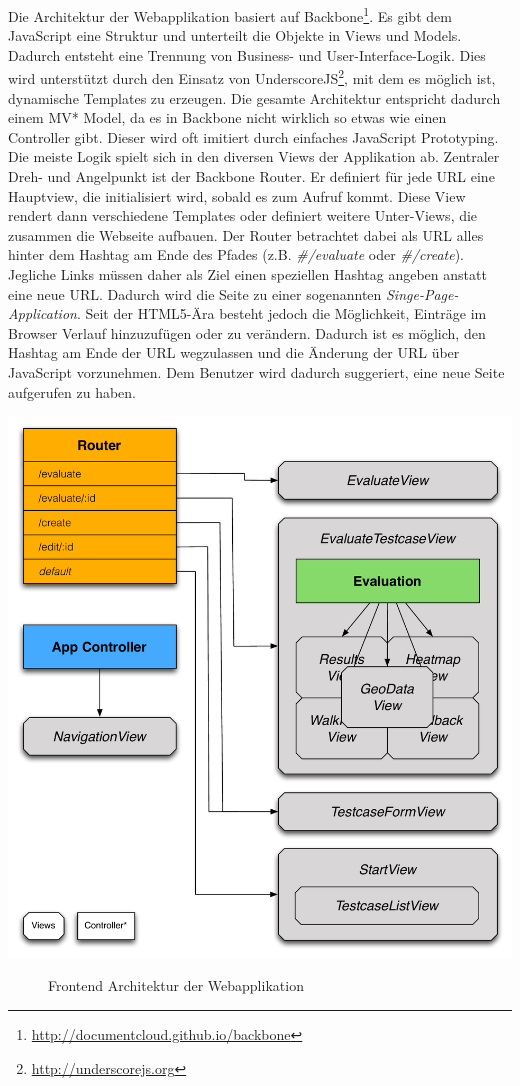 Die Architektur der Webapplikation basiert auf Backbone\footnote{\url{http://documentcloud.github.io/backbone}}. Es gibt dem JavaScript eine Struktur und unterteilt die Objekte in Views und Models. Dadurch entsteht eine Trennung von Business- und User-Interface-Logik. Dies wird unterstützt durch den Einsatz von UnderscoreJS\footnote{\url{http://underscorejs.org}}, mit dem es möglich ist, dynamische Templates zu erzeugen. Die gesamte Architektur entspricht dadurch einem MV* Model, da es in Backbone nicht wirklich so etwas wie einen Controller gibt. Dieser wird oft imitiert durch einfaches JavaScript Prototyping. Die meiste Logik spielt sich in den diversen Views der Applikation ab. Zentraler Dreh- und Angelpunkt ist der Backbone Router. Er definiert für jede URL eine Hauptview, die initialisiert wird, sobald es zum Aufruf kommt. Diese View rendert dann verschiedene Templates oder definiert weitere Unter-Views, die zusammen die Webseite aufbauen. Der Router betrachtet dabei als URL alles hinter dem Hashtag am Ende des Pfades (z.B. \textit{\#/evaluate} oder \textit{\#/create}). Jegliche Links müssen daher als Ziel einen speziellen Hashtag angeben anstatt eine neue URL. Dadurch wird die Seite zu einer sogenannten \textit{Singe-Page-Application}. Seit der HTML5-Ära besteht jedoch die Möglichkeit, Einträge im Browser Verlauf hinzuzufügen oder zu verändern. Dadurch ist es möglich, den Hashtag am Ende der URL wegzulassen und die Änderung der URL über JavaScript vorzunehmen. Dem Benutzer wird dadurch suggeriert, eine neue Seite aufgerufen zu haben.\\

\begin{center}
\includegraphics[scale=0.55]{./images/architecture}
\end{center}
\begin{figure}[htb]
   \centering
   \caption{Frontend Architektur der Webapplikation}
    \label{webappview}
\end{figure}

